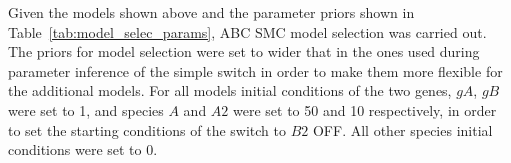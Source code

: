 %
%
%

Given the models shown above and the parameter priors shown in Table~\ref{tab:model_selec_params}, ABC SMC model selection was carried out. The priors for model selection were set to wider that in the ones used during parameter inference of the simple switch in order to make them more flexible for the additional models. For all models initial conditions of the two genes, $gA$, $gB$ were set to 1, and species $A$ and $A2$ were set to 50 and 10 respectively, in order to set the starting conditions of the switch to $B2$ OFF. All other species initial conditions were set to 0. 

\begin{table}[htbp]
\centerfloat
\caption{The prior distributions used for model selection. The values indicate the lower and upper limits of a uniform distribution.}
\label{tab:model_selec_params}
\end{table}


